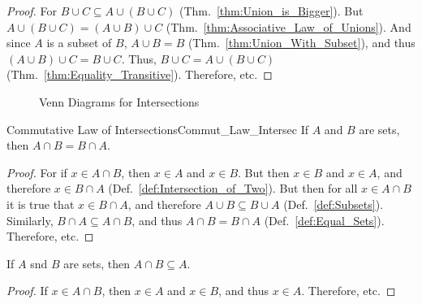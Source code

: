         \begin{proof}
            For $B\cup{C}\subseteq{A}\cup(B\cup{C})$
            (Thm.~\ref{thm:Union_is_Bigger}). But
            $A\cup(B\cup{C})=(A\cup{B})\cup{C}$
            (Thm.~\ref{thm:Associative_Law_of_Unions}).
            And since $A$ is a subset of $B$, $A\cup{B}=B$
            (Thm.~\ref{thm:Union_With_Subset}), and thus
            $(A\cup{B})\cup{C}=B\cup{C}$. Thus, $B\cup{C}=A\cup(B\cup{C})$
            (Thm.~\ref{thm:Equality_Transitive}). Therefore, etc.
        \end{proof}
        \begin{figure}[H]
            \centering
            \captionsetup{type=figure}
            \begin{subfigure}[b]{0.49\textwidth}
                \centering
                
            \end{subfigure}
            \caption{Venn Diagrams for Intersections}
            \label{fig:Union_Intersection_venn_diagram}
        \end{figure}
        \begin{ltheorem}{Commutative Law of Intersections}{Commut_Law_Intersec}
            If $A$ and $B$ are sets, then $A\cap{B}=B\cap{A}$.
        \end{ltheorem}
        \begin{proof}
            For if $x\in{A}\cap{B}$, then $x\in{A}$ and
            $x\in{B}$. But then $x\in{B}$ and $x\in{A}$,
            and therefore $x\in{B}\cap{A}$
            (Def.~\ref{def:Intersection_of_Two}). But then
            for all $x\in{A}\cap{B}$ it is true that
            $x\in{B}\cap{A}$, and therefore
            $A\cup{B}\subseteq{B}\cup{A}$
            (Def.~\ref{def:Subsets}). Similarly,
            $B\cap{A}\subseteq{A}\cap{B}$, and thus
            $A\cap{B}=B\cap{A}$ (Def.~\ref{def:Equal_Sets}).
            Therefore, etc.
        \end{proof}
        \begin{theorem}
            \label{thm:Intersection_is_Smaller}%
            If $A$ snd $B$ are sets, then
            $A\cap{B}\subseteq{A}$.
        \end{theorem}
        \begin{proof}
            If $x\in{A}\cap{B}$, then $x\in{A}$ and
            $x\in{B}$, and thus $x\in{A}$. Therefore, etc.
        \end{proof}
